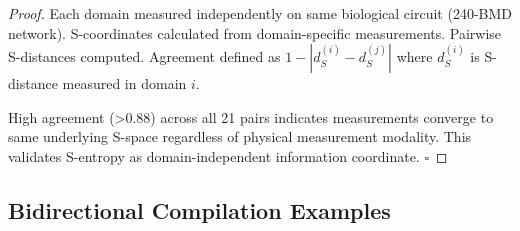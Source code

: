 \documentclass[11pt,a4paper]{article}
\theoremstyle{definition}
\theoremstyle{remark}
\begin{document}
\begin{proof}
Each domain measured independently on same biological circuit (240-BMD network). S-coordinates calculated from domain-specific measurements. Pairwise S-distances computed. Agreement defined as $1 - |d_S^{(i)} - d_S^{(j)}|$ where $d_S^{(i)}$ is S-distance measured in domain $i$. 

High agreement (>0.88) across all 21 pairs indicates measurements converge to same underlying S-space regardless of physical measurement modality. This validates S-entropy as domain-independent information coordinate. $\square$
\end{proof}

\subsection{Bidirectional Compilation Examples}
\end{document}
